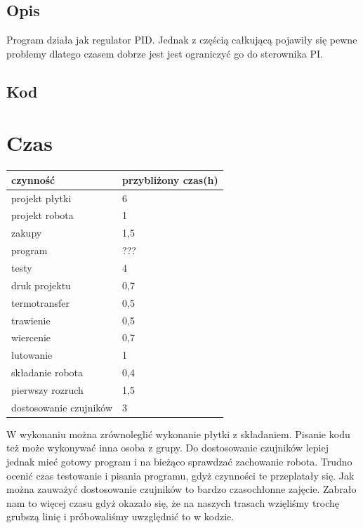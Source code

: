\documentclass[a4paper,11pt]{article}
\begin{document}
\subsection{Opis}
Program działa jak regulator PID. Jednak z częścią całkującą pojawiły się pewne problemy dlatego czasem dobrze jest jest ograniczyć go do sterownika PI.

\subsection{Kod}

\section{Czas}
\begin{center}


	\begin{tabular}{|l|l|}
		\hline
		czynność				& przybliżony czas(h)		\\ \hline
		projekt płytki			& 6							\\
		projekt robota			& 1							\\
		zakupy					& 1,5						\\
		program					& ???						\\
		testy					& 4							\\
		druk projektu			& 0,7						\\
		termotransfer			& 0,5						\\
		trawienie				& 0,5						\\
		wiercenie				& 0,7						\\
		lutowanie				& 1							\\
		składanie robota			& 0,4						\\
		pierwszy rozruch			& 1,5						\\
		dostosowanie czujników	& 3							\\

		\hline
	\end{tabular}
\end{center}
W wykonaniu można zrównoleglić  wykonanie płytki z składaniem. Pisanie kodu też może wykonywać inna osoba z grupy. Do dostosowanie czujników lepiej jednak mieć gotowy program i na bieżąco sprawdzać zachowanie robota.
Trudno ocenić czas testowanie i pisania programu, gdyż czynności te przeplatały się.
Jak można zauważyć dostosowanie czujników to bardzo czasochłonne zajęcie. Zabrało nam to więcej czasu gdyż okazało się, że na naszych trasach wzięliśmy trochę grubszą linię i próbowaliśmy uwzględnić to w kodzie.
\end{document}
